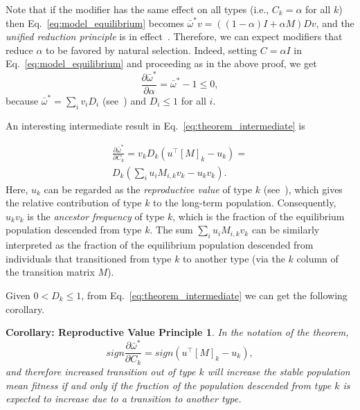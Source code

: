 \documentclass[9pt, a4paper, twocolumn]{extarticle}   	%
\newcommand*{\tr}{^\intercal}
\newtheorem*{rvp}{Corollary: Reproductive Value Principle}
\begin{document}
Note that if the modifier has the same effect on all types (i.e.,
$C_k = \alpha$ for all $k$) then Eq.~\ref{eq:model_equilibrium}
becomes $\bar{\omega}^* v = ((1-\alpha)I + \alpha M)Dv$,
and the \emph{unified reduction principle} is in effect~\cite[eqs. 65, 72]{Altenberg2017}.
Therefore, we can expect modifiers that reduce $\alpha$ to be favored by natural selection.
Indeed, setting $C = \alpha I$ in Eq.~\ref{eq:model_equilibrium} and proceeding as in the above proof, we get
$$
\frac{\partial \bar{\omega}^*}{\partial \alpha} = 
\bar{\omega}^* - 1 \le 0,
$$
because $\bar{\omega}^* = \sum_i{v_i D_i}$ (see~) and $D_i \le 1$ for all $i$.


An interesting intermediate result in Eq.~\ref{eq:theorem_intermediate} is

\begin{equation}
\begin{aligned}
\frac{\partial \bar{\omega}^*}{\partial C_k} = 
v_k D_k (u\tr[M]_k - u_k) = \\
D_k (\sum_i{u_i M_{i,k} v_k} - u_k v_k).
\end{aligned}
\end{equation}
Here, $u_k$ can be regarded as the \emph{reproductive value} of type $k$ (see~), which gives the relative contribution of type $k$ to the long-term population.
Consequently, $u_k v_k$ is the \emph{ancestor frequency} \citep{Hermisson2002} of type $k$, which is the fraction of the equilibrium population descended from type $k$.
The sum $\sum_i{u_i M_{i,k} v_k}$ can be similarly interpreted as the fraction of the equilibrium population descended from individuals that transitioned from type $k$ to another type (via the $k$ column of the transition matrix $M$).

Given $0 < D_k \le 1$, from Eq.~\ref{eq:theorem_intermediate} we can get the following corollary.

\begin{rvp}
In the notation of the theorem,
\begin{equation}
sign \frac{\partial \bar{\omega}^*}{\partial C_k} = 
sign (u\tr [M]_k - u_k),
\end{equation}
and therefore increased transition out of type $k$ will increase the stable population mean fitness if and only if the fraction of the population descended from type $k$ is expected to increase due to a transition to another type. 
\end{rvp}
\end{document}
